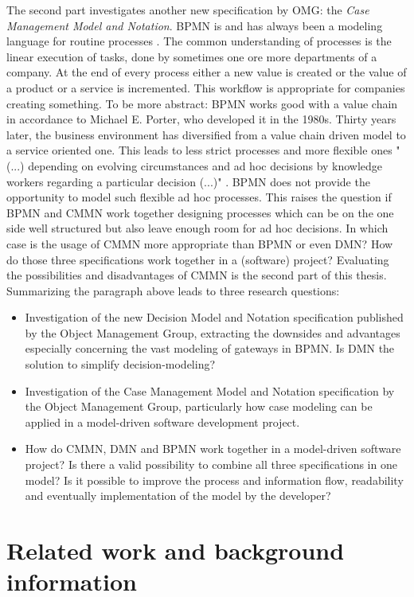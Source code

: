 \documentclass[11pt,a4paper,draft]{article}
\begin{document}
The second part investigates another new specification by OMG: the \textit{Case Management Model and Notation}. 
BPMN is and has always been a modeling language for routine processes \citep[see]{Zeising_2014}. The common understanding of processes is the linear execution of tasks, done by sometimes one ore more departments of a company. At the end of every process either a new value is created or the value of a product or a service is incremented. This workflow is appropriate for companies creating something. To be more abstract: BPMN works good with a value chain in accordance to Michael E. Porter, who developed it in the 1980s. 
Thirty years later, the business environment has diversified from a value chain driven model to a service oriented one. This leads to less strict processes and more flexible ones "(...) depending on evolving circumstances and ad hoc decisions by knowledge workers regarding a particular decision (...)" \citep{cmmnSpec}. BPMN does not provide the opportunity to model such flexible ad hoc processes. This raises the question if BPMN and CMMN work together designing processes which can be on the one side well structured but also leave enough room for ad hoc decisions. In which case is the usage of CMMN more appropriate than BPMN or even DMN? How do those three specifications work together in a (software) project? Evaluating the possibilities and disadvantages of CMMN is the second part of this thesis. \\
Summarizing the paragraph above leads to three research questions: 
\begin{itemize}
\item Investigation of the new Decision Model and Notation specification published by the Object Management Group, extracting the downsides and advantages especially concerning the vast modeling of gateways in BPMN. Is DMN the solution to simplify decision-modeling? 
\item Investigation of the Case Management Model and Notation specification by the Object Management Group, particularly how case modeling can be applied in a model-driven software development project. 
\item How do CMMN, DMN and BPMN work together in a model-driven software project? Is there a valid possibility to combine all three specifications in one model? Is it possible to improve the process and information flow, readability and eventually implementation of the model by the developer?   
\end{itemize}

\section{Related work and background information}
\end{document}
